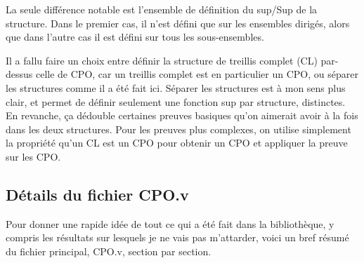 \documentclass{article}
\newcommand\code[1]{{\fontfamily{lmtt}\selectfont #1}}
\theoremstyle{definition}
\begin{document}
La seule différence notable est l'ensemble de définition du sup/Sup de la structure. Dans le premier cas, il n'est défini que sur les ensembles dirigés, alors que dans l'autre cas il est défini sur tous les sous-ensembles. 

Il a fallu faire un choix entre définir la structure de treillis complet (CL) par-dessus celle de CPO, car un treillis complet est en particulier un CPO, ou séparer les structures comme il a été fait ici. Séparer les structures est à mon sens plus clair, et permet de définir seulement une fonction sup par structure, distinctes. En revanche, ça dédouble certaines preuves basiques qu'on aimerait avoir à la fois dans les deux structures. Pour les preuves plus complexes, on utilise simplement la propriété qu'un CL est un CPO pour obtenir un CPO et appliquer la preuve sur les CPO.





\subsection{Détails du fichier CPO.v}


Pour donner une rapide idée de tout ce qui a été fait dans la bibliothèque, y compris les résultats sur lesquels je ne vais pas m'attarder, voici un bref résumé du fichier principal, \code{CPO.v}, section par section.

\medskip
\end{document}
